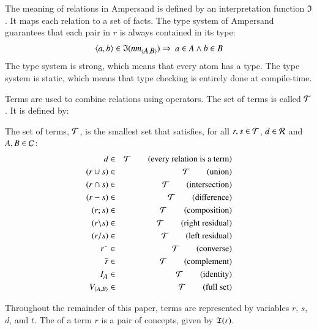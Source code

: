 \documentclass{elsarticle}
\begin{document}
	The meaning of relations in Ampersand is defined by an interpretation function $\mathfrak{I}$.
	It maps each relation to a set of facts.
	The type system of Ampersand guarantees that each pair in $r$ is always contained in its type:
\begin{equation}
	\langle{a},{b}\rangle\in\mathfrak{I}(\text{\em nm\/}_{\langle{\text{\em \small A\/}},{\text{\em \small B\/}}\rangle}) \Rightarrow\ a \in A \wedge b \in B \label{typing of relations}
\end{equation}
	The type system is strong, which means that every atom has a type.
	The type system is static, which means that type checking is entirely done at compile-time.

	Terms are used to combine relations using operators.
	The set of terms is called $\mathcal{T}$. It is defined by:
\begin{definition}[terms]
\label{def:terms}
\item   The set of terms, $\mathcal{T}$, is the smallest set that satisfies, for all $r,s \in \mathcal{T}$, $d\in\mathcal{R}$ and $A,B \in \mathcal{C}$: 
\begin{eqnarray}
	d&\in&\mathcal{T}         \quad\quad\text{(every relation is a term)}\\
	(r \cup s)&\in&\mathcal{T}\quad\quad\text{(union)}\\
	(r \cap s)&\in&\mathcal{T}\quad\quad\text{(intersection)}\\
	(r-s)&\in&\mathcal{T}     \quad\quad\text{(difference)}\label{def:difference}\\
	(r;s)&\in&\mathcal{T}     \quad\quad\text{(composition)}\\
	(r\backslash s)&\in&\mathcal{T}     \quad\quad\text{(right residual)}\\
	(r\slash s)&\in&\mathcal{T}     \quad\quad\text{(left residual)}\\
	{r}^\smallsmile&\in&\mathcal{T}   \quad\quad\text{(converse)}\\
	\overline{r}&\in&\mathcal{T}   \quad\quad\text{(complement)}\\
	I_{\text{\em \small A\/}}&\in&\mathcal{T} \quad\quad\text{(identity)}\\
	V_{\langle{A},{B}\rangle}&\in&\mathcal{T} \quad\quad\text{(full set)}
\end{eqnarray}
\end{definition}
	Throughout the remainder of this paper,	terms are represented by variables $r$, $s$, $d$, and $t$.
	The  of a term $r$ is a pair of concepts, given by $\mathfrak{T}(r)$.
\end{document}
